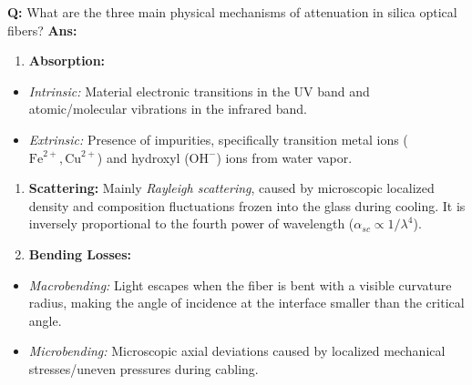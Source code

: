 \documentclass[10pt,a4paper,twocolumn]{article}
\begin{document}
\begin{tcolorbox}[
  colback=white,
  colframe=UnitColorThree,
  colbacktitle=gray!10!white,
  coltitle=black,
  fonttitle=\bfseries\sffamily\small,
  title={Unit III $\bullet$ Card 2: Attenuation Mechanisms},
  boxrule=1.2pt,
  arc=2mm,
  outer arc=2mm,
  boxsep=1.5mm,
  top=1mm,
  bottom=1mm,
  left=1.5mm,
  right=1.5mm,
  before skip=2.5mm,
  after skip=2.5mm
]
\textbf{Q:} What are the three main physical mechanisms of attenuation in silica optical fibers?
\tcbline
\textbf{Ans:} \begin{enumerate}
  \item \textbf{Absorption:}
\end{enumerate}
\begin{itemize}
  \item   \textit{Intrinsic:} Material electronic transitions in the UV band and atomic/molecular vibrations in the infrared band.
  \item   \textit{Extrinsic:} Presence of impurities, specifically transition metal ions ($\text{Fe}^{2+}, \text{Cu}^{2+}$) and hydroxyl ($\text{OH}^-$) ions from water vapor.
\end{itemize}
\begin{enumerate}
  \item \textbf{Scattering:} Mainly \textit{Rayleigh scattering}, caused by microscopic localized density and composition fluctuations frozen into the glass during cooling. It is inversely proportional to the fourth power of wavelength ($\alpha_{sc} \propto 1/\lambda^4$).
  \item \textbf{Bending Losses:}
\end{enumerate}
\begin{itemize}
  \item   \textit{Macrobending:} Light escapes when the fiber is bent with a visible curvature radius, making the angle of incidence at the interface smaller than the critical angle.
  \item   \textit{Microbending:} Microscopic axial deviations caused by localized mechanical stresses/uneven pressures during cabling.
\end{itemize}
\end{tcolorbox}
\end{document}
